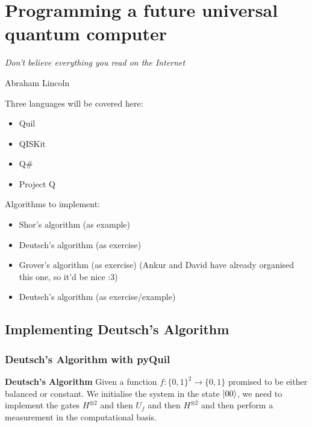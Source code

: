 \chapter{Programming a future universal quantum computer}
\label{Programmingquantumcomputer}

\epigraph{\textit{Don't believe everything you read on the Internet}}{Abraham Lincoln}

Three languages will be covered here: 
\begin{itemize}
    \item Quil
    \item QISKit 
    \item Q\#
    \item Project Q
\end{itemize}

Algorithms to implement:
\begin{itemize}
    \item Shor's algorithm (as example)
    \item Deutsch's algorithm (as exercise)
    \item Grover's algorithm (as exercise) (Ankur and David have already organised this one, so it'd be nice :3) 
    \item Deutsch's algorithm (as exercise/example)
\end{itemize}

\newpage
\section{Implementing Deutsch's Algorithm}

\subsection{Deutsch's Algorithm with pyQuil}

\begin{tcolorbox}[standard jigsaw,
    opacityback=0,  %
    boxrule=0.5pt]
    {\bf Deutsch's Algorithm}
    \tcbline
    Given a function $f:\{0,1\}^2\rightarrow \{0,1\}$ promised to be either balanced or constant. We initialise the system in the state $\left\vert{00}\right\rangle$, we need to implement the gates $H^{\otimes 2}$ and then $U_f$ and then $H^{\otimes 2}$ and then perform a measurement in the computational basis.
\end{tcolorbox}

